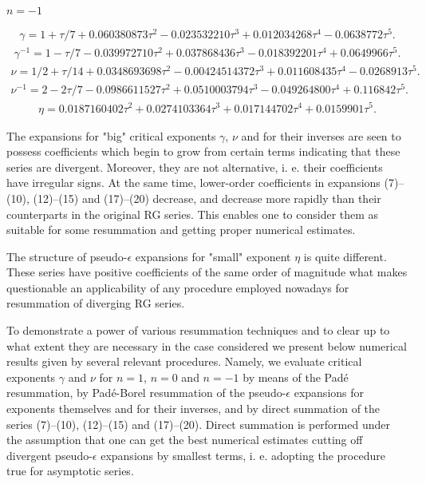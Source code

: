 \documentclass[aps,prb,preprint,showpacs,preprintnumbers,amsmath,amssymb]{revtex4}
\begin{document}
\begin{center}
\textbf{$n = -1$}
\end{center}
\begin{eqnarray}
\gamma = 1 + \tau/7 + 0.060380873 \tau^{2}-0.023532210 \tau^{3}
+ 0.012034268 \tau^{4}-0.0638772 \tau^{5}.
\end{eqnarray}
\begin{eqnarray}
\gamma^{-1} = 1- \tau/7 - 0.039972710 \tau^2+0.037868436 \tau^3
- 0.018392201 \tau^{4}+ 0.0649966 \tau^{5}.
\end{eqnarray}
\begin{eqnarray}
\nu = 1/2 + \tau/14 + 0.0348693698 \tau^{2}
- 0.00424514372 \tau^{3} + 0.011608435 \tau^{4} - 0.0268913 \tau^{5}.
\end{eqnarray}
\begin{eqnarray}
\nu^{-1} = 2 - 2\tau/7 - 0.0986611527 \tau^{2}
+ 0.0510003794 \tau^{3} - 0.049264800 \tau^{4} + 0.116842 \tau^{5}.
\end{eqnarray}
\begin{eqnarray}
\eta = 0.0187160402 {\tau}^{2} + 0.0274103364 {\tau}^{3}
+ 0.017144702 {\tau}^{4} + 0.0159901 {\tau}^{5}.
\end{eqnarray}

The expansions for "big" critical exponents $\gamma$, $\nu$ and for their
inverses are seen to possess coefficients which begin to grow from certain
terms indicating that these series are divergent. Moreover, they are not
alternative, i. e. their coefficients have irregular signs. At the same time,
lower-order coefficients in expansions (7)--(10), (12)--(15) and (17)--(20)
decrease, and decrease more rapidly than their counterparts in the original
RG series. This enables one to consider them as suitable for some resummation
and getting proper numerical estimates.

The structure of pseudo-$\epsilon$ expansions for "small" exponent $\eta$ is
quite different. These series have positive coefficients of the same order of
magnitude what makes questionable an applicability of any procedure employed
nowadays for resummation of diverging RG series.

To demonstrate a power of various resummation techniques and to clear up to
what extent they are necessary in the case considered we present below numerical
results given by several relevant procedures. Namely, we evaluate critical
exponents $\gamma$ and $\nu$ for $n=1$, $n=0$ and $n =-1$ by means of the Pad\'e
resummation, by Pad\'e-Borel resummation of the pseudo-$\epsilon$ expansions for
exponents themselves and for their inverses, and by direct summation of the series
(7)--(10), (12)--(15) and (17)--(20). Direct summation is performed under the
assumption that one can get the best numerical estimates cutting off divergent
pseudo-$\epsilon$ expansions by smallest terms, i. e. adopting the procedure
true for asymptotic series.
\end{document}
